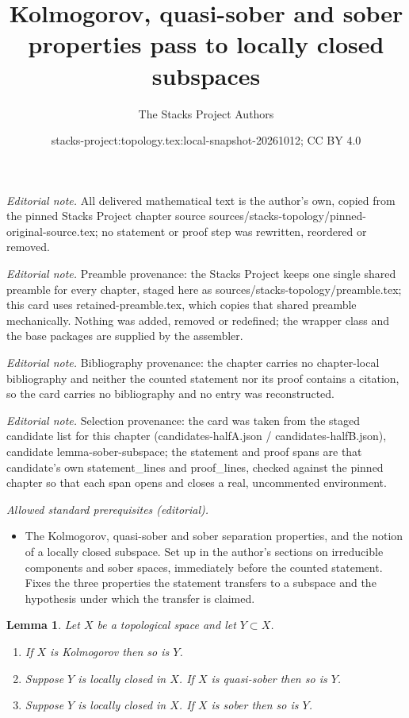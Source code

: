 \documentclass[10pt,a4paper]{amsart}
\title{Kolmogorov, quasi-sober and sober properties pass to locally closed subspaces}
\author{The Stacks Project Authors}
\date{stacks-project:topology.tex:local-snapshot-20261012; CC BY 4.0}
\theoremstyle{plain}
\newtheorem{lemma}[subsection]{Lemma}
\theoremstyle{definition}
\theoremstyle{remark}
\numberwithin{equation}{subsection}
\begin{document}
\maketitle
\noindent\textit{Editorial note.} All delivered mathematical text is the author's own, copied from the pinned Stacks Project chapter source sources/stacks-topology/pinned-original-source.tex; no statement or proof step was rewritten, reordered or removed.\par\medskip
\noindent\textit{Editorial note.} Preamble provenance: the Stacks Project keeps one single shared preamble for every chapter, staged here as sources/stacks-topology/preamble.tex; this card uses retained-preamble.tex, which copies that shared preamble mechanically. Nothing was added, removed or redefined; the wrapper class and the base packages are supplied by the assembler.\par\medskip
\noindent\textit{Editorial note.} Bibliography provenance: the chapter carries no chapter-local bibliography and neither the counted statement nor its proof contains a citation, so the card carries no bibliography and no entry was reconstructed.\par\medskip
\noindent\textit{Editorial note.} Selection provenance: the card was taken from the staged candidate list for this chapter (candidates-halfA.json / candidates-halfB.json), candidate lemma-sober-subspace; the statement and proof spans are that candidate's own statement\_lines and proof\_lines, checked against the pinned chapter so that each span opens and closes a real, uncommented environment.\par\medskip
\noindent\textit{Allowed standard prerequisites (editorial).}\begin{itemize}
\item The Kolmogorov, quasi-sober and sober separation properties, and the notion of a locally closed subspace. Set up in the author's sections on irreducible components and sober spaces, immediately before the counted statement. Fixes the three properties the statement transfers to a subspace and the hypothesis under which the transfer is claimed.
\end{itemize}\medskip
\begin{lemma}
\label{lemma-sober-subspace}
Let $X$ be a topological space and let $Y\subset X$.
\begin{enumerate}
\item If $X$ is Kolmogorov then so is $Y$.
\item Suppose $Y$ is locally closed in $X$. If $X$ is quasi-sober then
so is $Y$.
\item Suppose $Y$ is locally closed in $X$. If $X$ is sober then so is $Y$.
\end{enumerate}
\end{lemma}
\end{document}
